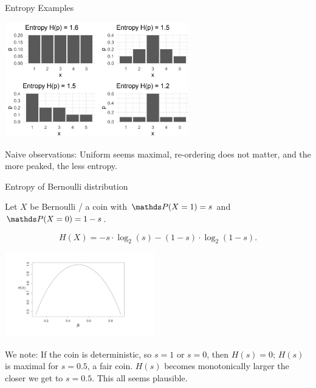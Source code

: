 \begin{vbframe}{Entropy Examples}
    
\begin{center}
\includegraphics[width = 8cm ]{figure_man/entropy.png} \\
\end{center}

Naive observations: Uniform seems maximal, re-ordering does not matter, and the more peaked, the less entropy.
\end{vbframe}

\begin{vbframe}{Entropy of Bernoulli distribution}

Let $X$ be Bernoulli / a coin with $\P(X=1) = s$ and $\P(X=0) = 1 - s$.

$$ H(X)= -s \cdot \log_2(s)-(1-s)\cdot \log_2(1-s). $$

\begin{center}
\includegraphics[width = 6.5cm ]{figure_man/coin-entropy.png} \\
\end{center}

We note: If the coin is deterministic, so $s=1$ or $s=0$, then $H(s)=0$; 
$H(s)$ is maximal for $s = 0.5$, a fair coin. 
$H(s)$ becomes monotonically larger the closer we get to $s=0.5$.
This all seems plausible.

\end{vbframe}
  
